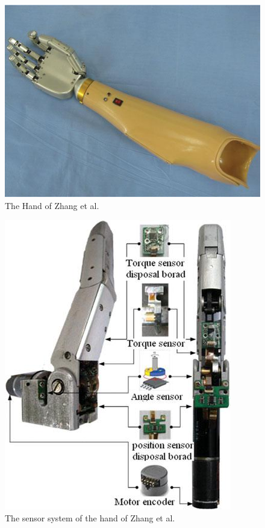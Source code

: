 \documentclass[a4paper, 10pt, conference]{ieeeconf}      %
\begin{document}
\vspace{1cm}

\begin{figure}[h]

	\centering
	\includegraphics[scale=0.7]{images/Zhang}
	
	\caption{The Hand of Zhang et al.}
\end{figure}

\begin{figure}[h]

	\centering
	\includegraphics[scale=0.7]{images/Zhang2}
	
	\caption{The sensor system of the hand of Zhang et al.}
	\label{fig:senszhang}
\end{figure}
\end{document}
